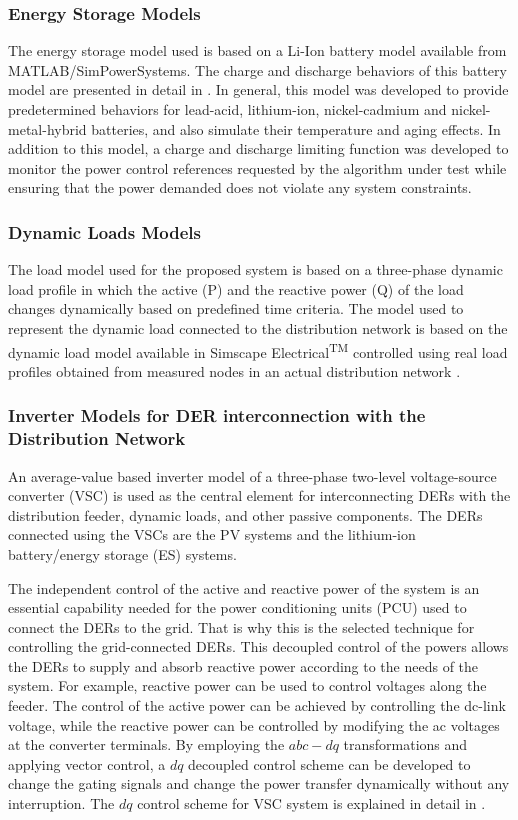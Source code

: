 \subsubsection{Energy Storage Models}
The energy storage model used is based on a Li-Ion battery model available from MATLAB/SimPowerSystems. The charge and discharge behaviors of this battery model are presented in detail in  \cite{tremblay}. In general, this model was developed to provide predetermined behaviors for lead-acid, lithium-ion, nickel-cadmium and nickel-metal-hybrid batteries, and also simulate their temperature and aging effects. In addition to this model, a charge and discharge limiting function was developed to monitor the power control references requested by the algorithm under test while ensuring that the power demanded does not violate any system constraints.


\subsubsection{Dynamic Loads Models}
The load model used for the proposed system is based on a three-phase dynamic load profile in which the active (P) and the reactive power (Q) of the load changes dynamically based on predefined time criteria. The model used to represent the dynamic load connected to the distribution network is based on the dynamic load model available in Simscape Electrical\textsuperscript{TM} controlled using real load profiles obtained from measured nodes in an actual distribution network \cite{sungrin}. 

\subsubsection{Inverter Models for DER interconnection with the Distribution Network }An average-value based inverter model of a three-phase two-level voltage-source converter (VSC) is used as the central element for interconnecting DERs with the distribution feeder, dynamic loads, and other passive components. The DERs connected using the VSCs are the PV systems and the lithium-ion battery/energy storage (ES) systems. 

The independent control of the active and reactive power of the system is an essential capability needed for the power conditioning units (PCU) used to connect the DERs to the grid. That is why this is the selected technique for controlling the grid-connected DERs. This decoupled control of the powers allows the DERs to supply and absorb reactive power according to the needs of the system. For example, reactive power can be used to control voltages along the feeder. The control of the active power can be achieved by controlling the dc-link voltage, while the reactive power can be controlled by modifying the ac voltages at the converter terminals. By employing the \(abc-dq\) transformations and applying vector control, a \(dq\) decoupled control scheme can be developed to change the gating signals and change the power transfer dynamically without any interruption. The \(dq\) control scheme for VSC system is explained in detail in \cite{yazdani}. 




